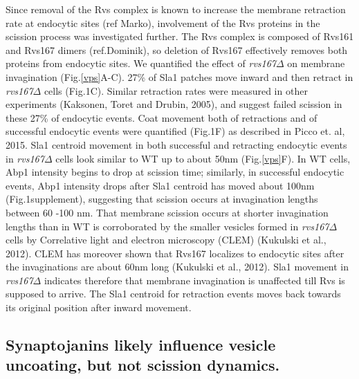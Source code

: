 \documentclass[9pt,lineno]{elife}
\begin{document}
Since removal of the Rvs complex is known to increase the membrane retraction rate at endocytic sites (ref Marko), involvement of the Rvs proteins in the scission process was investigated further. The Rvs complex is composed of Rvs161 and Rvs167 dimers (ref.Dominik), so deletion of Rvs167 effectively removes both proteins from endocytic sites. We quantified the effect of \textit{rvs167$\Delta$} on membrane invagination (Fig.\ref{vps}A-C). 27\% of Sla1 patches move inward and then retract in \textit{rvs167$\Delta$} cells (Fig.1C). Similar retraction rates were measured in other experiments (Kaksonen, Toret and Drubin, 2005), and suggest failed scission in these 27\% of endocytic events. Coat movement both of retractions and of successful endocytic events were quantified (Fig.1F) as described in Picco et. al, 2015. Sla1 centroid movement in both successful and retracting endocytic events in \textit{rvs167$\Delta$} cells look similar to WT up to about 50nm (Fig.\ref{vps}F). In WT cells, Abp1 intensity begins to drop at scission time; similarly, in successful endocytic events, Abp1 intensity drops after Sla1 centroid has moved about 100nm (Fig.1supplement), suggesting that scission occurs at invagination lengths between 60 -100 nm. That membrane scission occurs at shorter invagination lengths than in WT is corroborated by the smaller vesicles formed in \textit{rvs167$\Delta$} cells by Correlative light and electron microscopy (CLEM) (Kukulski et al., 2012). CLEM has moreover shown that Rvs167 localizes to endocytic sites after the invaginations are about 60nm long (Kukulski et al., 2012). Sla1 movement in \textit{rvs167$\Delta$}  indicates therefore that membrane invagination is unaffected till Rvs is supposed to arrive.  The Sla1 centroid for retraction events moves back towards its original position after inward movement. 




\subsection{Synaptojanins likely influence vesicle uncoating, but not scission dynamics.}
\end{document}
